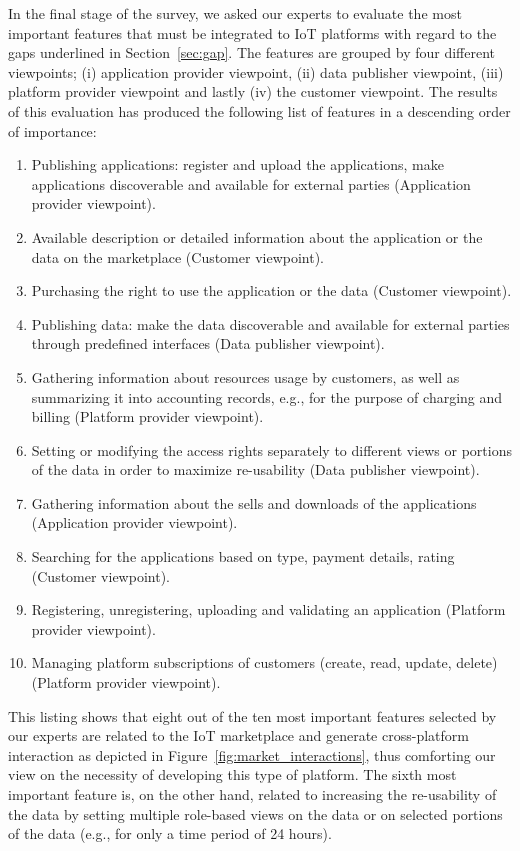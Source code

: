 \documentclass[preprint,10pt,5p]{elsarticle}
\begin{document}
In the final stage of the survey, we asked our experts to evaluate the
most important features that must be integrated to IoT platforms with
regard to the gaps underlined in Section~\ref{sec:gap}. The features
are grouped by four different viewpoints; (i) application provider
viewpoint, (ii) data publisher viewpoint, (iii) platform provider
viewpoint and lastly (iv) the customer viewpoint.
The results of this evaluation has produced the following list of
features in a descending order of importance:
\begin{enumerate}
  \item Publishing applications: register and upload the
    applications, make applications discoverable and available for
    external parties (Application provider viewpoint).
  \item Available description or detailed information about the
    application or the data on the marketplace (Customer viewpoint).
  \item Purchasing the right to use the application or the data
    (Customer viewpoint).
  \item Publishing data: make the data discoverable and
    available for external parties through predefined interfaces (Data
    publisher viewpoint).
  \item Gathering information about resources usage by customers, as
    well as summarizing it into accounting records, e.g., for the
    purpose of charging and billing (Platform provider viewpoint).
  \item Setting or modifying the access rights separately to different
    views or portions of the data in order to maximize re-usability
    (Data publisher viewpoint).
  \item Gathering information about the sells and downloads of the
    applications (Application provider viewpoint).
  \item Searching for the applications based on type, payment details,
    rating (Customer viewpoint).
  \item Registering, unregistering, uploading and validating an
    application (Platform provider viewpoint).
  \item Managing platform subscriptions of customers (create, read,
    update, delete) (Platform provider viewpoint).
\end{enumerate}

This listing shows that eight out of the ten  most important features
selected by our experts are related to the IoT marketplace and generate cross-platform interaction as depicted in Figure~\ref{fig:market_interactions}, thus
comforting our view on the necessity of developing this type of
platform. The sixth most important feature is, on the other hand,
related to increasing the re-usability of the data by setting multiple
role-based views on the data or on selected portions of the data
(e.g., for only a time period of 24 hours). 
\end{document}
